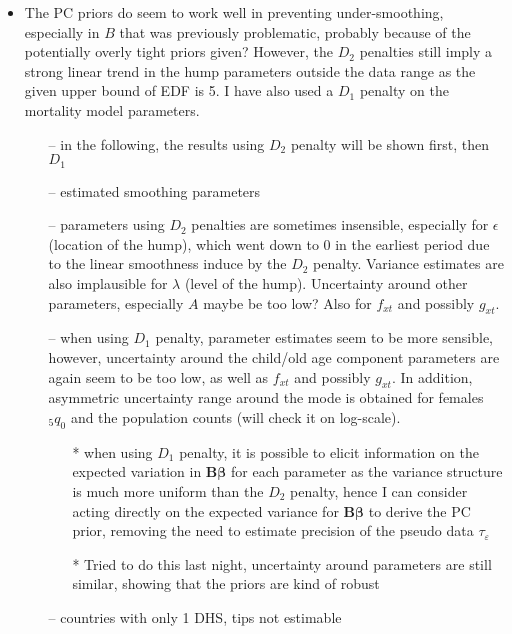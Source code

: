 \documentclass[12pt,a4paper]{article}
\begin{document}
\begin{itemize}
	\item The PC priors do seem to work well in preventing under-smoothing, especially in $B$ that was previously problematic, probably because of the potentially overly tight priors given? However, the $D_2$ penalties still imply a strong linear trend in the hump parameters outside the data range as the given upper bound of EDF is 5. I have also used a $D_1$ penalty on the mortality model parameters.
	\begin{itemize}
	\item[--] in the following, the results using $D_2$ penalty will be shown first, then $D_1$
	\item[--] estimated smoothing parameters 
	\item[--] parameters using $D_2$ penalties are sometimes insensible, especially for $\epsilon$ (location of the hump), which went down to 0 in the earliest period due to the linear smoothness induce by the $D_2$ penalty. Variance estimates are also implausible for $\lambda$ (level of the hump). Uncertainty around other parameters, especially $A$ maybe be too low? Also for $f_{xt}$ and possibly $g_{xt}$.
	\item[--] when using $D_1$ penalty, parameter estimates seem to be more sensible, however, uncertainty around the child/old age component parameters are again seem to be too low, as well as $f_{xt}$ and possibly $g_{xt}$. In addition, asymmetric uncertainty range around the mode is obtained for females $_5q_0$ and the population counts (will check it on log-scale).
	\begin{itemize}
	\item[*] when using $D_1$ penalty, it is possible to elicit information on the expected variation in $\boldsymbol{B\beta}$ for each parameter as the variance structure is much more uniform than the $D_2$ penalty, hence I can consider acting directly on the expected variance for $\boldsymbol{B\beta}$ to derive the PC prior, removing the need to estimate precision of the pseudo data $\tau_{\varepsilon}$
	\item[*] Tried to do this last night, uncertainty around parameters are still similar, showing that the priors are kind of robust
	\end{itemize}
	\item[--] countries with only 1 DHS, tips not estimable
	\end{itemize}
\end{itemize}




\end{document}
